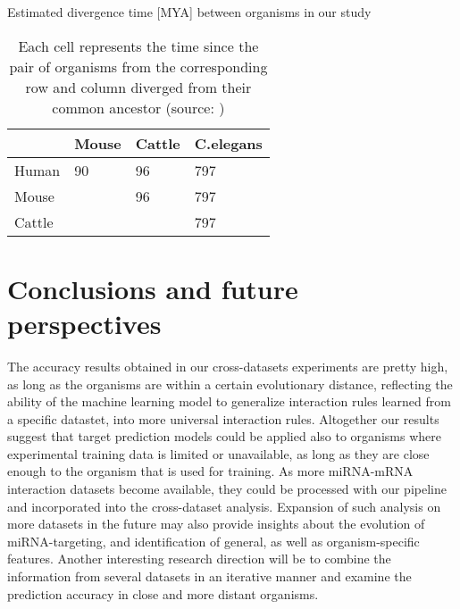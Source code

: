 \begin{table}[h!]
\caption{Estimated divergence time {[}MYA{]} between organisms in our study}
\label{tab:evolutiontime}
\begin{tabular}{|l|l|l|l|}
\hline
             & Mouse & Cattle & C.elegans \\ \hline
Human & 90  & 96         & 797                    \\ \hline
Mouse          &     & 96         & 797                    \\ \hline
Cattle   &     &            & 797                    \\ \hline
\end{tabular}
\caption*{Each cell represents the time since the pair of organisms from the corresponding row and column diverged from their common ancestor (source: \cite{kumar2017timetree})}
\end{table}



\section{Conclusions and future perspectives}
The accuracy results obtained in our cross-datasets experiments are pretty high, as long as the organisms are within a certain evolutionary distance, reflecting the ability of the machine learning model to generalize interaction rules learned from a specific datastet, into more universal interaction rules. Altogether our results suggest that target prediction models could be applied also to organisms where experimental training data is limited or unavailable, as long as they are close enough to the organism that is used for training.
As more miRNA-mRNA interaction datasets become available, they could be processed with our pipeline and incorporated into the cross-dataset analysis. Expansion of such analysis on more datasets in the future may also provide insights about the evolution of miRNA-targeting, and identification of general, as well as organism-specific features. Another interesting research direction will be to combine the information from several datasets in an iterative manner and examine the prediction accuracy in close and more distant organisms.
